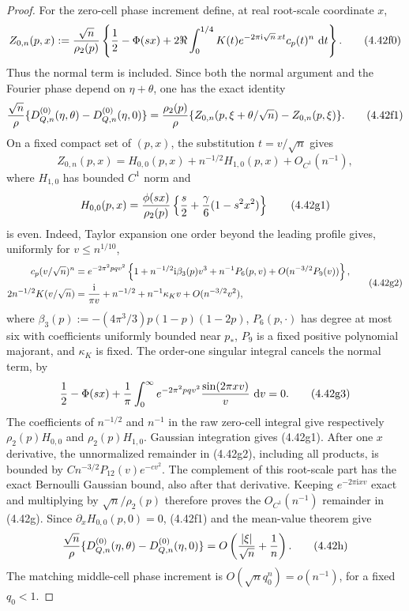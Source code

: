 \documentclass[11pt,a4paper]{article}
\numberwithin{equation}{section}
\theoremstyle{definition}
\theoremstyle{remark}
\newcommand{\ii}{\mathrm i}
\newcommand{\dd}{\,\mathrm d}
\begin{document}
\begin{proof}
For the zero-cell phase increment define, at real root-scale coordinate
$x$,
\[
 Z_{0,n}(p,x):={\sqrt n\over\rho_2(p)}\left\{
 {1\over2}-\Phi(sx)+2\Re\int_0^{1/4}K(t)
       e^{-2\pi\ii\sqrt n\,x t}c_p(t)^n\,\dd t\right\}.             \tag{4.42f0}
\]
Thus the normal term is included.  Since both the normal argument and the
Fourier phase depend on $\eta+\theta$, one has the exact identity
\[
 {\sqrt n\over\rho}
 \{D^{(0)}_{Q,n}(\eta,\theta)-D^{(0)}_{Q,n}(\eta,0)\}
 ={\rho_2(p)\over\rho}
 \{Z_{0,n}(p,\xi+\theta/\sqrt n)-Z_{0,n}(p,\xi)\}.       \tag{4.42f1}
\]
On a fixed compact set of $(p,x)$, the substitution $t=v/\sqrt n$ gives
\[
 Z_{0,n}(p,x)=H_{0,0}(p,x)+n^{-1/2}H_{1,0}(p,x)
                         +O_{C^1}(n^{-1}),             \tag{4.42g}
\]
where $H_{1,0}$ has bounded $C^1$ norm and
\[
 H_{0,0}(p,x)={\phi(sx)\over\rho_2(p)}
       \left\{{s\over2}+{\gamma\over6}(1-s^2x^2)\right\}          \tag{4.42g1}
\]
is even.  Indeed, Taylor expansion one order beyond the leading profile
gives, uniformly for $v\le n^{1/10}$,
\[
 \begin{aligned}
 c_p(v/\sqrt n)^n
 &=e^{-2\pi^2pqv^2}\left\{1+n^{-1/2}\ii\beta_3(p)v^3
       +n^{-1}P_6(p,v)+O(n^{-3/2}P_9(v))\right\},\\
 2n^{-1/2}K(v/\sqrt n)
 &={\ii\over\pi v}+n^{-1/2}+n^{-1}\kappa_Kv
       +O(n^{-3/2}v^2),
 \end{aligned}                                                \tag{4.42g2}
\]
where $\beta_3(p):=-(4\pi^3/3)p(1-p)(1-2p)$,
$P_6(p,\cdot)$ has degree at most six with coefficients uniformly
bounded near $p_*$, $P_9$ is a fixed positive polynomial majorant, and
$\kappa_K$ is fixed.  The order-one singular integral cancels the normal
term, by
\[
 {1\over2}-\Phi(sx)+{1\over\pi}\int_0^\infty
       e^{-2\pi^2pqv^2}{\sin(2\pi xv)\over v}\,\dd v=0.           \tag{4.42g3}
\]
The coefficients of $n^{-1/2}$ and $n^{-1}$ in the raw zero-cell
integral give respectively $\rho_2(p)H_{0,0}$ and
$\rho_2(p)H_{1,0}$.  Gaussian integration gives (4.42g1).
After one $x$ derivative, the unnormalized remainder in (4.42g2),
including all products, is bounded by
$Cn^{-3/2}P_{12}(v)e^{-cv^2}$.  The complement of this root-scale part has
the exact Bernoulli Gaussian bound, also after that derivative.  Keeping
$e^{-2\pi\ii x v}$ exact and multiplying by $\sqrt n/\rho_2(p)$ therefore
proves the $O_{C^1}(n^{-1})$ remainder in (4.42g).  Since
$\partial_x H_{0,0}(p,0)=0$, (4.42f1) and the mean-value theorem give
\[
 {\sqrt n\over\rho}
 \{D^{(0)}_{Q,n}(\eta,\theta)-D^{(0)}_{Q,n}(\eta,0)\}
 =O\left({|\xi|\over\sqrt n}+{1\over n}\right).       \tag{4.42h}
\]
The matching middle-cell phase increment is
$O(\sqrt n q_0^n)=o(n^{-1})$, for a fixed $q_0<1$.


\end{proof}
\end{document}
